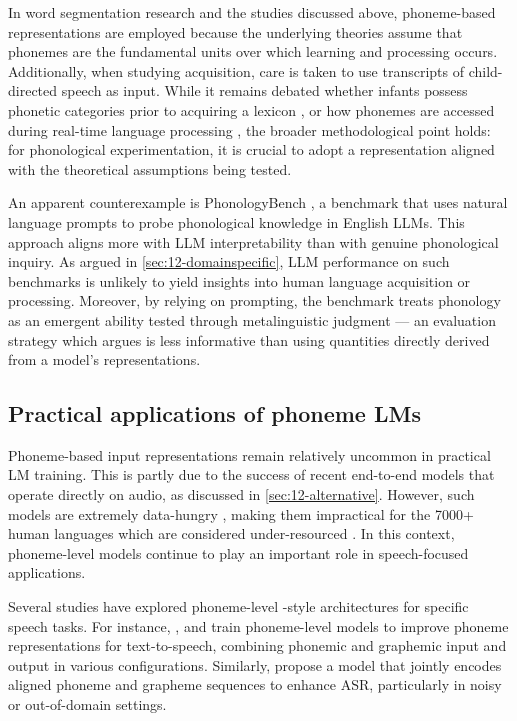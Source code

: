 In word segmentation research and the studies discussed above, phoneme-based representations are employed because the underlying theories assume that phonemes are the fundamental units over which learning and processing occurs. Additionally, when studying acquisition, care is taken to use transcripts of child-directed speech as input. While it remains debated whether infants possess phonetic categories prior to acquiring a lexicon \citep[e.g.][]{feldman_infants_2021}, or how phonemes are accessed during real-time language processing \citep[e.g.][]{mcmurray_myth_2022}, the broader methodological point holds: for phonological experimentation, it is crucial to adopt a representation aligned with the theoretical assumptions being tested.

An apparent counterexample is PhonologyBench \citep{suvarna-etal-2024-phonologybench}, a benchmark that uses natural language prompts to probe phonological knowledge in English LLMs. This approach aligns more with LLM interpretability than with genuine phonological inquiry. As argued in \cref{sec:12-domainspecific}, LLM performance on such benchmarks is unlikely to yield insights into human language acquisition or processing. Moreover, by relying on prompting, the benchmark treats phonology as an emergent ability tested through metalinguistic judgment --- an evaluation strategy which \citet{hu2023prompting} argues is less informative than using quantities directly derived from a model's representations. 

\subsection{Practical applications of phoneme LMs}\label{sec:12-practicalphoneme}

Phoneme-based input representations remain relatively uncommon in practical LM training. This is partly due to the success of recent end-to-end models that operate directly on audio, as discussed in \cref{sec:12-alternative}. However, such models are extremely data-hungry \citep{li2022recent}, making them impractical for the 7000+ human languages which are considered under-resourced \citep{scharenborg2020speech}. In this context, phoneme-level models continue to play an important role in speech-focused applications.

Several studies have explored phoneme-level \bert-style architectures for specific speech tasks. For instance, \citet{jia2021png},  \citet{zhang2022mixed} and \citet{li-2023-phoneme-level-bert} train phoneme-level models to improve phoneme representations for text-to-speech, combining phonemic and graphemic input and output in various configurations. Similarly, \citet{sundararaman-2021-phonemebert} propose a \bert model that jointly encodes aligned phoneme and grapheme sequences to enhance ASR, particularly in noisy or out-of-domain settings.

